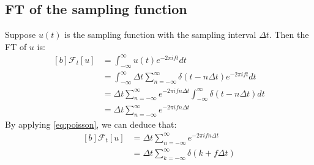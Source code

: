 \documentclass[letterpaper, 11pt]{article}
\newcommand{\fourier}[2]{\mathcal{F}_{#1}[#2]} %
\newcommand{\fint}{\int_{-\infty}^{\infty}} %
\newcommand{\ft}[3]{\fint #2 e^{-2\pi i#3#1} d#1} %
\newcommand{\fsum}[1]{\sum_{#1 = -\infty}^{\infty}}
\newcommand{\spf}[2]{\Delta #1 \fsum{#2} \delta (#1 - #2 \Delta #1)}
\numberwithin{equation}{section}
\numberwithin{figure}{section}
\begin{document}
\subsection{FT of the sampling function}
Suppose \(u(t)\) is the sampling function with the sampling interval \(\Delta t\). Then the FT of \(u\) is:
\begin{equation}
	\begin{aligned}[b]
		\fourier{t}{u}
			&= \ft{t}{u(t)}{f} \\
			&= \ft{t}{\spf{t}{n}}{f} \\
			&= \Delta t \fsum{n} e^{-2\pi ifn\Delta t} \fint \delta (t - n \Delta t) dt \\
			&= \Delta t \fsum{n} e^{-2\pi ifn\Delta t}
	\end{aligned}
\end{equation}
By applying \eqref{eq:poisson}, we can deduce that:
\begin{equation}
	\begin{aligned}[b]
		\fourier{t}{u}
			&= \Delta t \fsum{n} e^{-2\pi ifn\Delta t} \\
			&= \Delta t \fsum{k} \delta (k + f \Delta t)
	\end{aligned}
\end{equation}

\printindex
\end{document}
